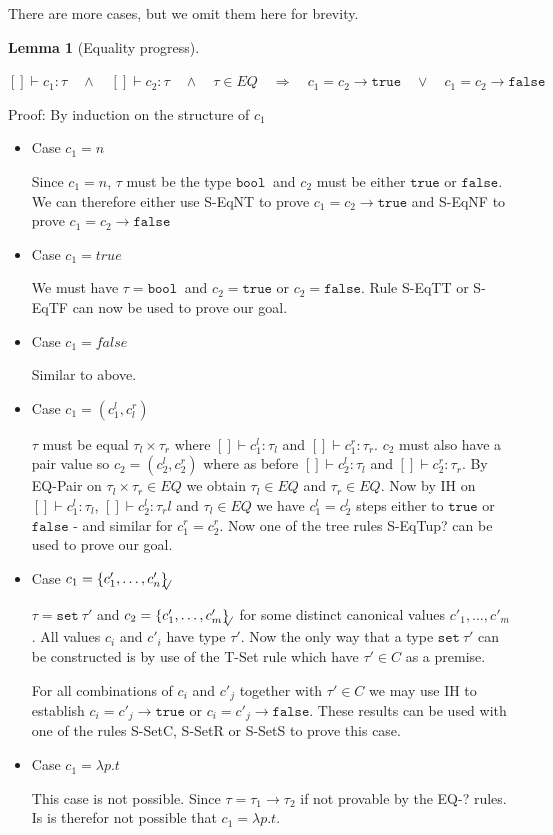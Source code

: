 \documentclass[a4paper]{article}
\newcommand{\s}[1]{\mathtt{#1}}
\newcommand{\sLb}{\s{\{}}
\newcommand{\sRb}{\s{\}}}
\newcommand{\sbool}{\s{bool\ }}
\newcommand{\sseta}{\s{set\ }}
\newcommand{\strue}{\s{true}}
\newcommand{\sfalse}{\s{false}}
\newcommand{\sset}[1]{\sLb #1 \sRb}
\newcommand{\ssetc}[1]{\sset{#1}_{\!\!\!\surd}}
\newcommand{\im}{\Rightarrow}
\newcommand{\step}{\to}
\newtheorem{lemma}{Lemma}[section]
\begin{document}
There are more cases, but
we omit them
here for brevity.

\begin{lemma}[Equality progress] $ $
  \label{lemma:equalityProgress}

$[]\vdash c_1:\tau \quad \land \quad []\vdash c_2:\tau \quad \land \quad \tau \in EQ \quad \im \quad
c_1 = c_2 \step \strue \quad \lor \quad c_1 = c_2 \step \sfalse$
\end{lemma}

Proof: By induction on the structure of $c_1$
\begin{itemize}
\item Case $c_1 = n$

Since $c_1 = n$, $\tau$ must be the type $\sbool$ and $c_2$ must be either $\strue$ or $\sfalse$. We can therefore either use S-EqNT to prove $c_1 = c_2 \step \strue$ and S-EqNF to prove $c_1 = c_2 \step \sfalse$

\item Case $c_1 = true$

We must have $\tau = \sbool$ and $c_2 = \strue$ or $c_2 = \sfalse$. Rule S-EqTT or S-EqTF can now be used to prove our goal.

\item Case $c_1 = false$

Similar to above.

\item Case $c_1 = (c_1^l, c_l^r)$

$\tau$ must be equal $\tau_l \times \tau_r$ where $[]\vdash c_1^l:\tau_l$ and $[]\vdash c_1^r:\tau_r$. $c_2$ must also have a pair value so $c_2 = (c_2^l, c_2^r)$ where as before $[]\vdash c_2^l:\tau_l$ and $[]\vdash c_2^r:\tau_r$. By EQ-Pair on $\tau_l \times \tau_r \in EQ$ we obtain $\tau_l \in EQ$ and $\tau_r \in EQ$. Now by IH on $[]\vdash c_1^l:\tau_l$, $[]\vdash c_2^l:\tau_rl$ and $\tau_l \in EQ$ we have $c_1^l = c_2^l$ steps either to $\strue$ or $\sfalse$ - and similar for $c_1^r = c_2^r$. Now one of the tree rules S-EqTup? can be used to prove our goal.

\item Case $c_1 = \ssetc{c'_1,\ldots,c'_n}$

$\tau = \sseta \tau'$ and $c_2 = \ssetc{c'_1,\ldots,c'_m}$ for some distinct canonical values $c'_1,\ldots,c'_m$. All values $c_i$ and $c'_i$ have type $\tau'$. Now the only way that a type $\sseta \tau'$ can be constructed is by use of the T-Set rule which have $\tau' \in C$ as a premise.

For all combinations of $c_i$ and $c'_j$ together with $\tau' \in C$ we may use IH to establish $c_i = c'_j \step \strue$ or $c_i = c'_j \step \sfalse$. These results can be used with one of the rules S-SetC, S-SetR or S-SetS to prove this case.

\item Case $c_1 = \lambda p.t$

This case is not possible. Since $\tau = \tau_1 \to \tau_2$ if not provable by the EQ-? rules. Is is therefor not possible that $c_1 = \lambda p.t$.
\end{itemize}
\end{document}
